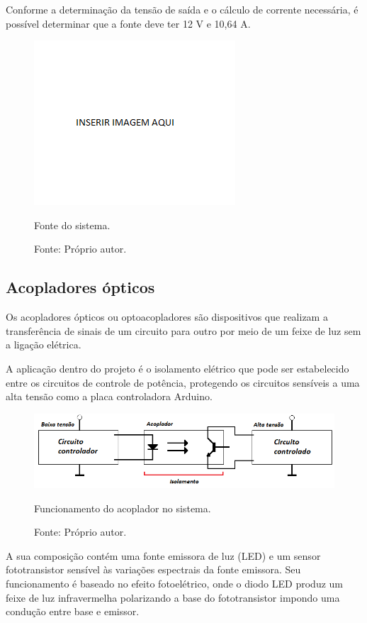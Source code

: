 Conforme a determinação da tensão de saída e o cálculo de corrente necessária, 
é possível determinar que a fonte deve ter 12 V e 10,64 A.

\begin{figure}[!htb]
\centering
\includegraphics[scale = 0.2]{figuras/3-17}
\caption{Fonte do sistema.}
\caption*{Fonte: Próprio autor.}
\label{fig:fonte}
\end{figure}
    
\subsection{Acopladores ópticos}\label{subsec:metacoplador}

Os acopladores ópticos ou optoacopladores são dispositivos que realizam a transferência de 
sinais de um circuito para outro por meio de um feixe de luz sem a ligação elétrica.

A aplicação dentro do projeto é o isolamento elétrico que pode ser estabelecido entre 
os circuitos de controle de potência, protegendo os circuitos sensíveis a uma alta tensão 
como a placa controladora Arduino.

\begin{figure}[!htb]
\centering
\includegraphics[scale = 0.7]{figuras/3-18}
\caption{Funcionamento do acoplador no sistema.}
\caption*{Fonte: Próprio autor.}
\label{fig:acoplador}
\end{figure}
    
A sua composição contém uma fonte emissora de luz (LED) e um sensor fototransistor sensível às variações 
espectrais da fonte emissora. Seu funcionamento é baseado no efeito fotoelétrico, onde o diodo LED produz 
um feixe de luz infravermelha polarizando a base do fototransistor impondo uma condução entre base e emissor.

